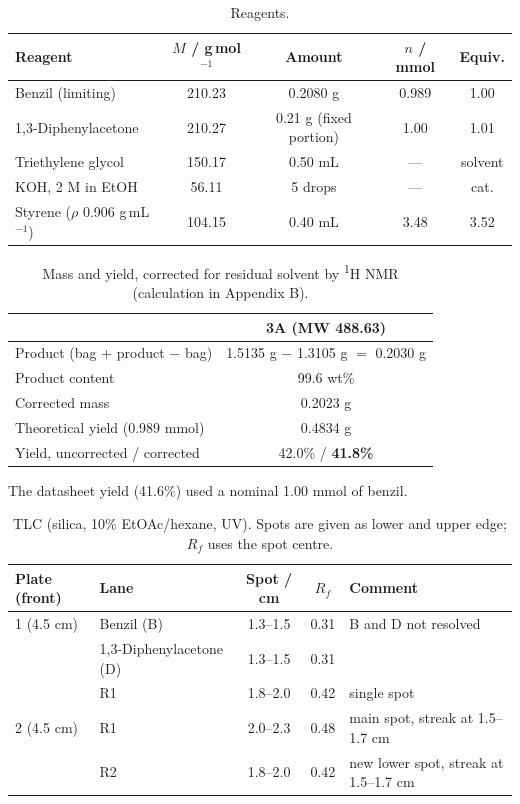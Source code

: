 \documentclass[11pt,a4paper]{article}
\begin{document}
\begin{table}[H]
\centering
\caption{Reagents.}
\label{tab:reagents}
\small
\begin{tabular}{lcccc}
\toprule
Reagent & $M$ / g\,mol$^{-1}$ & Amount & $n$ / mmol & Equiv. \\
\midrule
Benzil (limiting) & 210.23 & 0.2080 g & 0.989 & 1.00 \\
1,3-Diphenylacetone & 210.27 & 0.21 g (fixed portion) & 1.00 & 1.01 \\
Triethylene glycol & 150.17 & 0.50 mL & --- & solvent \\
KOH, 2 M in EtOH & 56.11 & 5 drops & --- & cat. \\
Styrene ($\rho$ 0.906 g\,mL$^{-1}$) & 104.15 & 0.40 mL & 3.48 & 3.52 \\
\bottomrule
\end{tabular}
\end{table}

\begin{table}[H]
\centering
\caption{Mass and yield, corrected for residual solvent by \textsuperscript{1}H NMR (calculation in Appendix B).\cite{Handout}}
\label{tab:yield}
\small
\begin{tabular}{lc}
\toprule
 & \textbf{3A} (MW 488.63) \\
\midrule
Product (bag + product $-$ bag) & 1.5135 g $-$ 1.3105 g $=$ 0.2030 g \\
Product content & 99.6 wt\% \\
Corrected mass & 0.2023 g \\
Theoretical yield (0.989 mmol) & 0.4834 g \\
Yield, uncorrected / corrected & 42.0\% / \textbf{41.8\%} \\
\bottomrule
\end{tabular}

\smallskip
\begin{minipage}{0.9\linewidth}\footnotesize
The datasheet yield (41.6\%) used a nominal 1.00 mmol of benzil.
\end{minipage}
\end{table}

\begin{table}[H]
\centering
\caption{TLC (silica, 10\% EtOAc/hexane, UV). Spots are given as lower and upper edge; $R_f$ uses the spot centre.}
\label{tab:tlc}
\small
\begin{tabular}{llccl}
\toprule
Plate (front) & Lane & Spot / cm & $R_f$ & Comment \\
\midrule
1 (4.5 cm) & Benzil (B) & 1.3--1.5 & 0.31 & B and D not resolved \\
 & 1,3-Diphenylacetone (D) & 1.3--1.5 & 0.31 & \\
 & R1 & 1.8--2.0 & 0.42 & single spot \\
2 (4.5 cm) & R1 & 2.0--2.3 & 0.48 & main spot, streak at 1.5--1.7 cm \\
 & R2 & 1.8--2.0 & 0.42 & new lower spot, streak at 1.5--1.7 cm \\
\bottomrule
\end{tabular}
\end{table}
\end{document}
